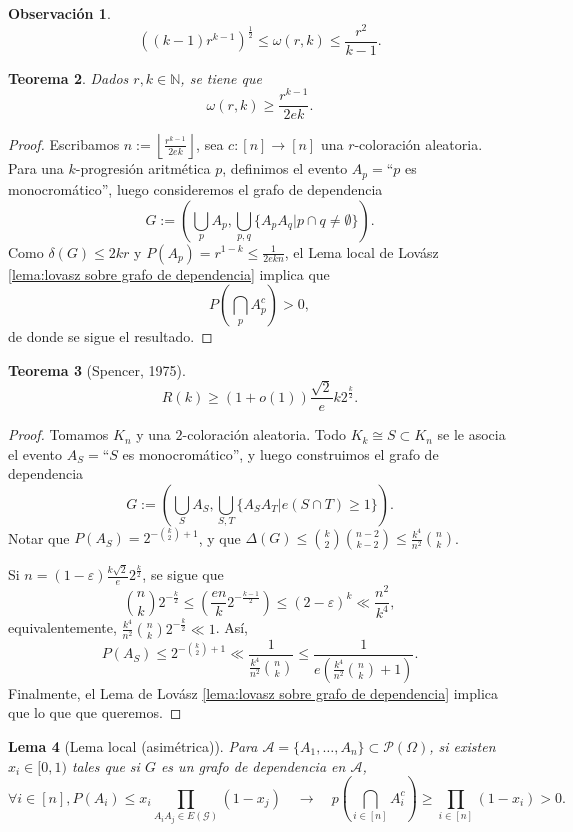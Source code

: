 \documentclass[12pt]{report}
\theoremstyle{plain}
\newtheorem{theorem}{Teorema}[section]
\newtheorem{lemma}[theorem]{Lema}
\theoremstyle{definition}
\newtheorem{obs}[theorem]{Observación}
\newcommand{\naturals}{\mathbb{N}}
\newcommand{\floor}[1]{\left\lfloor #1  \right\rfloor}
\begin{document}
\begin{obs}
\[
    \left ( (k-1) r^{k-1} \right )^{\frac 1 2} \leq \omega (r,k) \leq \frac{r^2}{k-1}.
\]
\end{obs}

\begin{theorem}
Dados $r,k \in \naturals$, se tiene que
\[
    \omega (r,k) \geq \frac{r^{k-1}}{2 e k}.
\]
\end{theorem}
\begin{proof}
Escribamos $n := \floor{\frac{r^{k-1}}{2 e k}}$, sea $c : [n] \to [n]$ una $r$-coloración aleatoria. Para una $k$-progresión aritmética $p$, definimos el evento $A_p = $``$p$ es monocromático'', luego consideremos el grafo de dependencia
\[
    G := \left ( \bigcup_{p} A_p , \bigcup_{p, q} \{A_p A_q | p \cap q \neq \emptyset\} \right ).
\]
Como $\delta (G) \leq 2 k r$ y $P(A_p) = r^{1-k} \leq \frac{1}{2 e k n}$, el Lema local de Lovász \ref{lema:lovasz sobre grafo de dependencia} implica que
\[
    P(\bigcap_{p} A_p^c) > 0,
\]
de donde se sigue el resultado.
\end{proof}

\begin{theorem}[Spencer, 1975]
\[
    R(k) \geq (1 + o(1)) \frac{\sqrt 2}{e} k 2^{\frac k 2}.
\]

\end{theorem}
\begin{proof}
Tomamos $K_n$ y una $2$-coloración aleatoria. Todo $K_k \cong S \subset K_n$ se le asocia el evento $A_S = $``$S$ es monocromático'', y luego construimos el grafo de dependencia
\[
    G:= \left ( \bigcup_S A_S, \bigcup_{S,T} \{A_S A_T | e(S \cap  T) \geq 1\} \right ).
\]
Notar que $P(A_S) = 2^{- \binom k 2 + 1}$, y que $\Delta (G) \leq \binom k 2 \binom{n-2}{k-2} \leq \frac{k^4}{n^2}\binom n k$.

Si $n = (1 - \varepsilon) \frac{k \sqrt 2}{e} 2^{\frac k 2}$, se sigue que
\[
    \binom n k 2^{- \frac k 2} \leq \left ( \frac{e n}{k} 2^{- \frac {k-1}2} \right ) \leq (2- \varepsilon)^k \ll \frac{n^2}{k^4},
\]
equivalentemente, $\frac{k^4}{n^2} \binom n k 2^{- \frac k 2} \ll 1$.
Así,
\[
    P(A_S) \leq 2^{- \binom k 2 + 1} \ll \frac{1}{\frac{k^4}{n^2} \binom n k} \leq \frac{1}{e \left ( \frac{k^4}{n^2} \binom n k +  1 \right )}.
\]
Finalmente, el Lema de Lovász \ref{lema:lovasz sobre grafo de dependencia} implica que lo que que queremos.
\end{proof}


\begin{lemma}[Lema local (asimétrica)]\label{lema:lema local asimetrica}
Para $\mathcal A = \{A_1, \ldots, A_n\} \subset \mathcal P (\Omega)$, si existen $x_i \in [0, 1)$ tales que si $G$ es un grafo de dependencia en $\mathcal A$,
\[
    \forall i \in [n] , P(A_i) \leq x_i \prod_{A_i A_j \in E(\mathcal G)} (1 - x_j) \quad \longrightarrow \quad p (\bigcap_{i \in [n]} A_i^c) \geq \prod_{i \in [n]} (1-x_i) > 0.
\]
\end{lemma}
\end{document}
